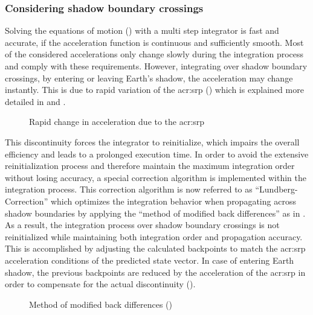 \subsubsection{Considering shadow boundary crossings}
\label{sec:propagation-state-integration-shadow}

Solving the equations of motion () with a multi step integrator is fast and accurate, if the acceleration function is continuous and sufficiently smooth. Most of the considered accelerations only change slowly during the integration process and comply with these requirements. However, integrating over shadow boundary crossings, by entering or leaving Earth's shadow, the acceleration may change instantly. This is due to rapid variation of the \gls{acr:srp} () which is explained more detailed in  and . 
\begin{figure}[!htb]
\centering

\caption{Rapid change in acceleration due to the \gls{acr:srp}  \label{ax:srpacc}}
\end{figure}
This discontinuity forces the integrator to reinitialize, which impairs the overall efficiency and leads to a prolonged execution time. In order to avoid the extensive reinitialization process and therefore maintain the maximum integration order without losing accuracy, a special correction algorithm is implemented within the integration process. This correction algorithm is now referred to as ``Lundberg-Correction'' which optimizes the integration behavior when propagating across shadow boundaries by applying the ``method of modified back differences'' as in \cite{lundberg1991}. As a result, the integration process over shadow boundary crossings is not reinitialized while maintaining both integration order and propagation accuracy. This is accomplished by adjusting the calculated backpoints to match the \gls{acr:srp} acceleration conditions of the predicted state vector. In case of entering Earth shadow, the previous backpoints are reduced by the acceleration of the \gls{acr:srp} in order to compensate for 
the actual discontinuity ().
\begin{figure}[!htb]
\centering

\caption{Method of modified back differences (\cite{lundberg1991})  \label{ax:accmod}}
\end{figure}
